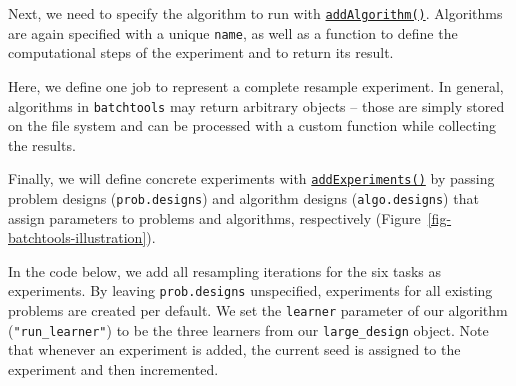 Next, we need to specify the algorithm to run with
\href{https://www.rdocumentation.org/packages/batchtools/topics/addAlgorithm}{\texttt{addAlgorithm()}}.
Algorithms are again specified with a unique \texttt{name}, as well as a
function to define the computational steps of the experiment and to
return its result.

Here, we define one job to represent a complete resample experiment. In
general, algorithms in \texttt{batchtools} may return arbitrary objects
-- those are simply stored on the file system and can be processed with
a custom function while collecting the results.

\begin{Shaded}
\begin{Highlighting}[]
\NormalTok{(}
  \NormalTok{,}
   
    \SpecialCharTok{$}\SpecialCharTok{$}
\NormalTok{  \},}
\NormalTok{)}
\end{Highlighting}
\end{Shaded}

Finally, we will define concrete experiments with
\href{https://www.rdocumentation.org/packages/batchtools/topics/addExperiments}{\texttt{addExperiments()}}
by passing problem designs (\texttt{prob.designs}) and algorithm designs
(\texttt{algo.designs}) that assign parameters to problems and
algorithms, respectively (Figure~\ref{fig-batchtools-illustration}).

In the code below, we add all resampling iterations for the six tasks as
experiments. By leaving \texttt{prob.designs} unspecified, experiments
for all existing problems are created per default. We set the
\texttt{learner} parameter of our algorithm (\texttt{"run\_learner"}) to
be the three learners from our \texttt{large\_design} object. Note that
whenever an experiment is added, the current seed is assigned to the
experiment and then incremented.

\begin{Shaded}
\begin{Highlighting}[]
\OtherTok{=} \NormalTok{(} \NormalTok{(}
\NormalTok{(}
\NormalTok{()}
\end{Highlighting}
\end{Shaded}

